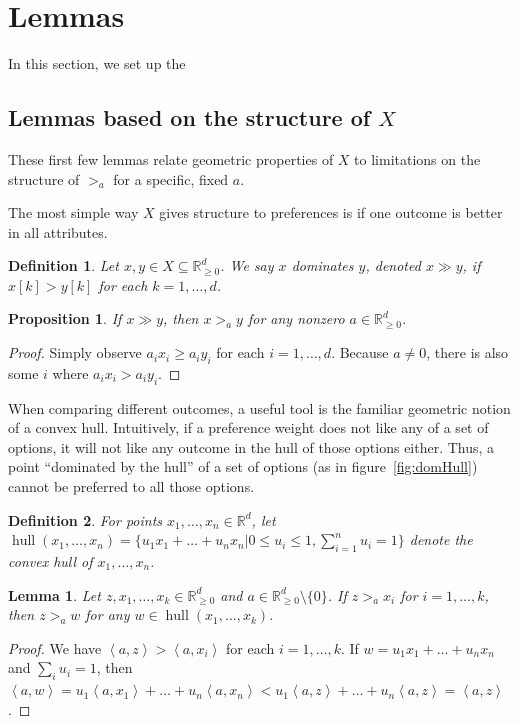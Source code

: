 \documentclass[12pt]{article}
\newtheorem*{definition}{Definition}
\newtheorem{proposition}[theorem]{Proposition}
\newtheorem{lemma}[theorem]{Lemma}
\newcommand{\R}{\mathbb{R}}
\newcommand{\Rgz}{\mathbb{R}_{\ge 0}}
\newcommand{\ip}[2]{\left\langle{#1},{#2}\right\rangle}
\DeclareMathOperator*{\hull}{hull}
\newcommand{\1}[1]{\mathds{1}[{#1}]}
\begin{document}
\section{Lemmas}
  In this section, we set up the 

  \subsection{Lemmas based on the structure of $X$}
    These first few lemmas relate geometric properties of $X$ to
    limitations on the structure of $>_a$ for a specific, fixed $a$.

    The most simple way $X$ gives structure to preferences is if
    one outcome is better in all attributes.
    \begin{definition}
      Let $x,y\in X\subseteq \Rgz^d$.
      We say $x$ \emph{dominates} $y$, denoted $x\gg y$,
      if $x[k] > y[k]$ for each $k=1,\ldots,d$.
    \end{definition}
    \begin{proposition}
      If $x \gg y$, then $x >_a y$ for any nonzero $a\in \Rgz^d$.
    \end{proposition}
    \begin{proof}
      Simply observe $a_i x_i \ge a_i y_i$ for each $i=1,\ldots, d$.
      Because $a\ne 0$, there is also some $i$ where $a_i x_i > a_i y_i$.
    \end{proof}

    When comparing different outcomes, a useful tool is
    the familiar geometric notion of a convex hull.
    Intuitively, if a preference weight does not like any of a set of options,
    it will not like any outcome in the hull of those options either.
    Thus, a point ``dominated by the hull'' of a set of options
    (as in figure~\ref{fig:domHull}) cannot be preferred to all those options.
    \begin{definition}
      For points $x_1,\ldots,x_n \in \R^d$, let $\hull(x_1,\ldots,x_n)
      = \{u_1x_1 + \ldots + u_nx_n | 0\le u_i\le 1, \sum_{i=1}^n u_i = 1\}$
      denote the convex hull of $x_1,\ldots,x_n$.
    \end{definition}
    \begin{lemma}\label{lem:agreementHull}
      Let $z,x_1,\ldots,x_k \in \Rgz^d$ and $a\in \Rgz^d \setminus \{0\}$.
      If $z >_a x_i$ for $i=1,\ldots,k$, then $z >_a w$
      for any $w\in \hull(x_1,\ldots,x_k)$.
    \end{lemma}
    \begin{proof}
      We have $\ip{a}{z} > \ip{a}{x_i}$ for each $i=1,\ldots,k$.
      If $w = u_1x_1+ \ldots + u_nx_n$ and $\sum_i u_i =1$, then
      $\ip{a}{w} = u_1\ip{a}{x_1}+\ldots+u_n\ip{a}{x_n}
      < u_1\ip{a}{z} + \ldots + u_n\ip{a}{z} = \ip{a}{z}$.
    \end{proof}
\end{document}
